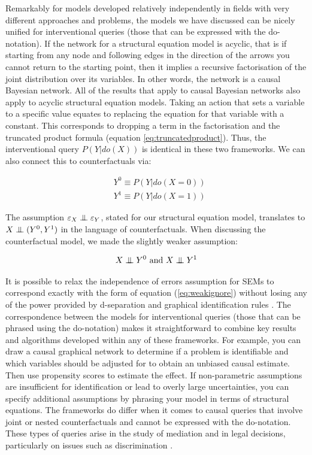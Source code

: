 \documentclass[11pt,a4paper,twoside]{report}
\theoremstyle{plain}
\theoremstyle{definition}
\let\epsilon\varepsilon
\newcommand{\ci}{\mathrel{\perp\mspace{-10mu}\perp}}
\begin{document}
Remarkably for models developed relatively independently in fields with very different approaches and problems, the models we have discussed can be nicely unified for interventional queries (those that can be expressed with the do-notation). If the network for a structural equation model is acyclic, that is if starting from any node and following edges in the direction of the arrows you cannot return to the starting point, then it implies a recursive factorisation of the joint distribution over its variables. In other words, the network is a causal Bayesian network. All of the results that apply to causal Bayesian networks also apply to acyclic structural equation models.  Taking an action that sets a variable to a specific value equates to replacing the equation for that variable with a constant. This corresponds to dropping a term in the factorisation and the truncated product formula (equation \ref{eq:truncatedproduct}). Thus, the interventional query $P(Y|do(X))$ is identical in these two frameworks. We can also connect this to counterfactuals via:

\begin{equation}
\begin{aligned}
&Y^{0} \equiv P(Y|do(X=0)) \\
&Y^{1} \equiv P(Y|do(X=1))
\end{aligned}
\end{equation}

The assumption $\epsilon_{X} \ci \epsilon_{Y}$, stated for our structural equation model, translates to $X \ci (Y^{0},Y^{1})$ in the language of counterfactuals. When discussing the counterfactual model, we made the slightly weaker assumption:

\begin{equation}
\label{eq:weakignore}
X \ci Y^{0} \text{ and } X \ci Y^{1}
\end{equation}

It is possible to relax the independence of errors assumption for SEMs to correspond exactly with the form of equation (\ref{eq:weakignore}) without losing any of the power provided by d-separation and graphical identification rules \citep{Richardson2013}. The correspondence between the models for interventional queries (those that can be phrased using the do-notation) makes it straightforward to combine key results and algorithms developed within any of these frameworks. For example, you can draw a causal graphical network to determine if a problem is identifiable and which variables should be adjusted for to obtain an unbiased causal estimate. Then use propensity scores \citep{Rosenbaum1983} to estimate the effect. If non-parametric assumptions are insufficient for identification or lead to overly large uncertainties, you can specify additional assumptions by phrasing your model in terms of structural equations. The frameworks do differ when it comes to causal queries that involve joint or nested counterfactuals and cannot be expressed with the do-notation. These types of queries arise in the study of mediation \citep{Pearl2014,Imai2010a,VanderWeele2011} and in legal decisions, particularly on issues such as discrimination \citep{Pearl2000}. 
\end{document}
